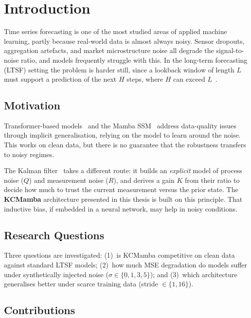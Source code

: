 \chapter{Introduction}
\label{ch:intro}

Time series forecasting is one of the most studied areas of applied machine
learning, partly because real-world data is almost always noisy.
Sensor dropouts, aggregation artefacts, and market microstructure noise all
degrade the signal-to-noise ratio, and models frequently struggle with this.
In the long-term forecasting (LTSF) setting the problem is harder still,
since a lookback window of length $L$ must support a prediction of the next $H$ steps,
where $H$ can exceed $L$~\cite{zhou2021informer}.

\section{Motivation}

Transformer-based models~\cite{zhou2021informer,wu2021autoformer} and the
Mamba SSM~\cite{gu2021s4,gu2023mamba} address data-quality issues through
implicit generalisation, relying on the model to learn around the noise.
This works on clean data, but there is no guarantee that the robustness
transfers to noisy regimes.

The Kalman filter~\cite{kalman1960new} takes a different route: it builds an
\emph{explicit} model of process noise ($Q$) and measurement noise ($R$), and
derives a gain $K$ from their ratio to decide how much to trust the current
measurement versus the prior state.
The \textbf{KCMamba} architecture presented in this thesis is built on
this principle. That inductive bias, if embedded in a neural network,
may help in noisy conditions.

\section{Research Questions}

Three questions are investigated: (1)~is KCMamba competitive on clean data
against standard LTSF models; (2)~how much MSE degradation do models suffer
under synthetically injected noise ($\sigma \in \{0, 1, 3, 5\}$);
and (3)~which architecture generalises better under scarce training data
(stride $\in \{1, 16\}$).

\section{Contributions}

